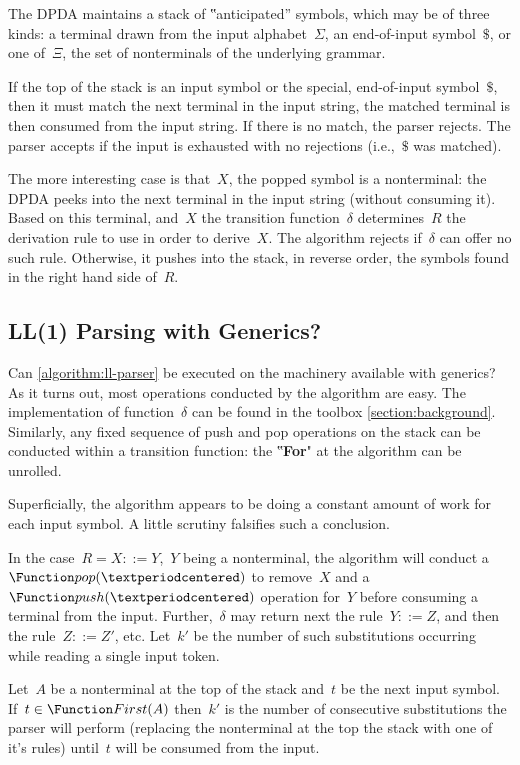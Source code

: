 The DPDA maintains a stack of ‟anticipated” symbols, which may
  be of three kinds: a terminal drawn from the input alphabet~$Σ$,
  an end-of-input symbol~$\$$, or one of~$Ξ$, the set of
  nonterminals of the underlying grammar.

If the top of the stack is an input symbol or the special,
 end-of-input symbol~$\$$, then it must match the next terminal
 in the input string, the matched terminal is then consumed from
 the input string.
If there is no match, the parser rejects.
The parser accepts if the input is exhausted with
  no rejections (i.e.,~$\$$ was matched).

The more interesting case is that~$X$, the popped symbol
  is a nonterminal: the DPDA peeks into the next terminal in the input
  string (without consuming it).
Based on this terminal, and~$X$ the transition function~$δ$
  determines~$R$ the derivation rule to use in order to derive~$X$.
The algorithm rejects if~$δ$ can offer no such rule.
Otherwise, it pushes into the stack, in reverse order, the symbols
  found in the right hand side of~$R$.

\subsection{LL(1) Parsing with \Java Generics?}
\label{section:limitations}
Can \cref{algorithm:ll-parser} be executed on the machinery
  available with \Java generics?
As it turns out, most operations conducted by the algorithm
  are easy.
The implementation of function~$δ$ can
  be found in the toolbox \cref{section:background}.
Similarly, any fixed sequence of push and pop
  operations on the stack can be conducted within a \Java
  transition function:
  the ‟\textbf{For}" at the algorithm can be unrolled.

Superficially, the algorithm appears to be doing a constant amount
  of work for each input symbol.
A little scrutiny falsifies such a conclusion.

In the case~$R=X::=Y$,~$Y$ %
  being a nonterminal, the algorithm will conduct
  a~$\Function pop(·)$ to remove~$X$ and a~$\Function push(·)$
  operation for~$Y$ before consuming a terminal from the input.
Further,~$δ$ may return next the rule~$Y::=Z$,
  and then the rule~$Z::=Z'$, etc.
Let~$k'$ be the number of such substitutions
  occurring while reading a single input token.

\begin{Definition}
  \label{substitution-factor}
  Let~$A$ be a nonterminal at the top of the stack
    and~$t$ be the next input symbol.
  If~$t \in \Function First(A)$ then~$k'$ is the number of 
  consecutive substitutions the parser will perform 
  (replacing the nonterminal at the top the stack with one of it's rules)
  until~$t$ will be consumed from the input.
\end{Definition}

